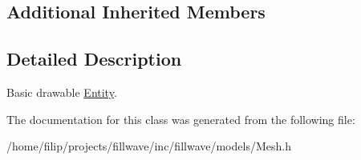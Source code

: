 \subsection*{Additional Inherited Members}


\subsection{Detailed Description}
Basic drawable \hyperlink{classflw_1_1flf_1_1Entity}{Entity}. 

The documentation for this class was generated from the following file\+:\begin{DoxyCompactItemize}
\item 
/home/filip/projects/fillwave/inc/fillwave/models/Mesh.\+h\end{DoxyCompactItemize}
